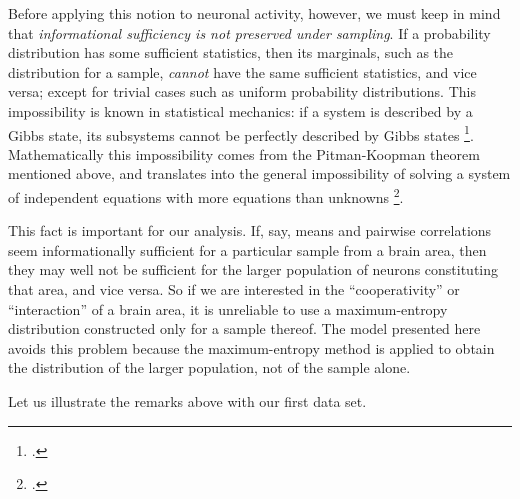 \documentclass[\ifafour a4paper,12pt,\else a5paper,10pt,\fi%
onecolumn,oneside,article,%
british%
]{memoir}
\theoremstyle{remark}
\theoremstyle{innote}
\newcommand*{\citep}{\footcites}
\renewcommand*{\|}{\nonscript\,\vert\nonscript\;\mathopen{}}
\newcommand*{\sect}{\S}%
\newcommand*{\eg}{{e.g.}}
\begin{document}
Before applying this notion to neuronal activity, however, we must keep in
mind that \emph{informational sufficiency is not preserved under sampling}.
If a probability distribution has some sufficient statistics, then its
marginals, such as the distribution for a sample, \emph{cannot} have the
same sufficient statistics, and vice versa; except for trivial cases such
as uniform probability distributions. %
This impossibility is known in statistical mechanics: if a system is
described by a Gibbs state, its subsystems cannot be perfectly described by
Gibbs states \citep[\eg][and references therein]{maesetal1999}.
Mathematically this impossibility comes from the Pitman-Koopman theorem
mentioned above, and translates into the general impossibility of solving a
system of independent equations with more equations than unknowns
\citep[\sect~3.1]{portamanaetal2015}.

This fact is important for our analysis. If, say, means and pairwise
correlations seem informationally sufficient for a particular sample from a
brain area, then they may well not be sufficient for the larger population
of neurons constituting that area, and vice versa. So if we are interested
in the \enquote{cooperativity} or \enquote{interaction} of a brain area, it
is unreliable to use a maximum-entropy distribution constructed only for a
sample
thereof. %
The model presented here avoids this problem because the maximum-entropy
method is applied to obtain the distribution of the larger population, not
of the sample alone.

\bigskip

Let us illustrate the remarks above with our first data set.
\end{document}

